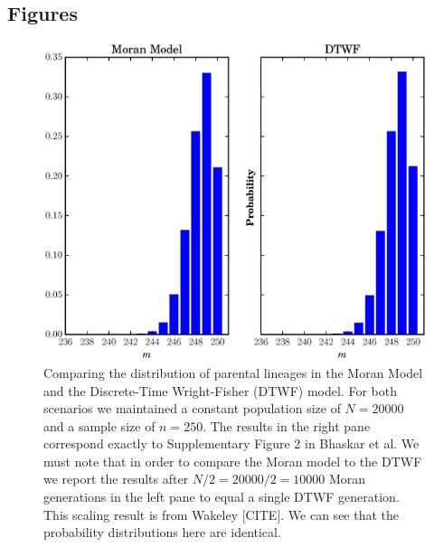 \documentclass[11pt]{article}
\begin{document}





\newpage

\subsection{Figures}

\begin{center}
	\begin{figure}[!ht]
		\includegraphics[scale=0.85]{../plots/moran_figure1}
		\caption{Comparing the distribution of parental lineages in the Moran Model and the Discrete-Time Wright-Fisher (DTWF) model. For both scenarios we maintained a constant population size of $N = 20000$ and a sample size of $n=250$. The results in the right pane correspond exactly to Supplementary Figure 2 in Bhaskar et al. We must note that in order to compare the Moran model to the DTWF we report the results after $N/2 = 20000/2 = 10000$ Moran generations in the left pane to equal a single DTWF generation. This scaling result is from Wakeley [CITE]. We can see that the probability distributions here are identical.}
	\end{figure}
\end{center}
\end{document}
